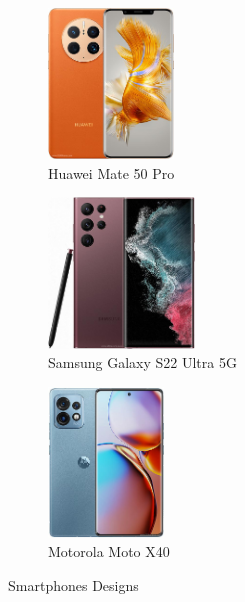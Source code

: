 \documentclass[10pt, UKenglish]{exam}
\begin{document}
\begin{figure}[htpb]
	\begin{subfigure}[htpb]{0.25\linewidth}
	\begin{center}
		\includegraphics[width=\linewidth,height=4cm,keepaspectratio]{huawei-mate-50-pro}
	\end{center}
	\caption{Huawei Mate 50 Pro}
	\label{fig:huawei-mate-50-pro}
	\end{subfigure}
	\begin{subfigure}[htpb]{0.25\linewidth}
	\begin{center}
		\includegraphics[width=\linewidth,height=4cm,keepaspectratio]{samsung-galaxy-s22-ultra-5g}
	\end{center}
	\caption{Samsung Galaxy S22 Ultra 5G}
	\label{fig:samsung-galaxy-s22-ultra-5g}
	\end{subfigure}
	\begin{subfigure}[htpb]{0.25\linewidth}
	\begin{center}
		\includegraphics[width=\linewidth,height=4cm,keepaspectratio]{motorola-moto-x40}
	\end{center}
	\caption{Motorola Moto X40}
	\label{fig:motorola-moto-x40}
	\end{subfigure}
	
	\caption{Smartphones Designs}
	\label{fig:smartphones-design}
\end{figure}
\end{document}
